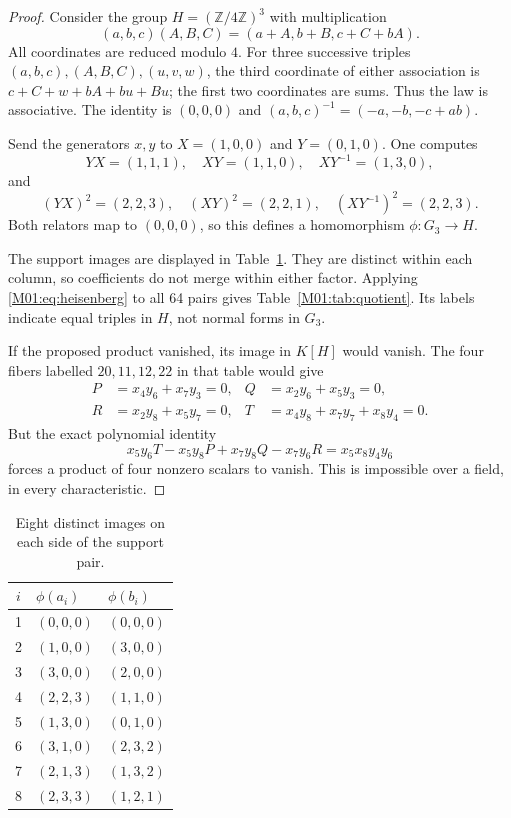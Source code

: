 \documentclass[11pt,a4paper,oneside]{report}
\theoremstyle{definition}
\theoremstyle{remark}
\newcommand{\Z}{\mathbb Z}
\begin{document}
\begin{proof}
Consider the group $H=(\Z/4\Z)^3$ with multiplication
\begin{equation}\label{M01:eq:heisenberg}
(a,b,c)(A,B,C)=(a+A,b+B,c+C+bA).
\end{equation}
All coordinates are reduced modulo $4$. For three successive triples
$(a,b,c),(A,B,C),(u,v,w)$, the third coordinate of either association
is $c+C+w+bA+bu+Bu$; the first two coordinates are sums.
Thus the law is associative. The identity is $(0,0,0)$ and
$(a,b,c)^{-1}=(-a,-b,-c+ab)$.

Send the generators $x,y$ to $X=(1,0,0)$ and $Y=(0,1,0)$.
One computes
\[
YX=(1,1,1),\quad XY=(1,1,0),\quad XY^{-1}=(1,3,0),
\]
and
\[
(YX)^2=(2,2,3),\quad (XY)^2=(2,2,1),\quad
(XY^{-1})^2=(2,2,3).
\]
Both relators map to $(0,0,0)$, so this defines a homomorphism
$\phi:G_3\to H$.

The support images are displayed in Table~\ref{M01:tab:images}. They are
distinct within each column, so coefficients do not merge within either
factor. Applying \eqref{M01:eq:heisenberg} to all 64 pairs gives
Table~\ref{M01:tab:quotient}. Its labels indicate equal triples in $H$,
not normal forms in $G_3$.

If the proposed product vanished, its image in $K[H]$ would vanish.
The four fibers labelled $20,11,12,22$ in that table would give
\begin{align*}
P&=x_4y_6+x_7y_3=0,&
Q&=x_2y_6+x_5y_3=0,\\
R&=x_2y_8+x_5y_7=0,&
T&=x_4y_8+x_7y_7+x_8y_4=0.
\end{align*}
But the exact polynomial identity
\begin{equation}\label{M01:eq:fourcert}
\boxed{x_5y_6T-x_5y_8P+x_7y_8Q-x_7y_6R
       =x_5x_8y_4y_6}
\end{equation}
forces a product of four nonzero scalars to vanish. This is impossible
over a field, in every characteristic.
\end{proof}

\begin{table}[htbp]
\centering\small
\begin{tabular}{@{}cll@{}}
\toprule
$i$ & $\phi(a_i)$ & $\phi(b_i)$\\
\midrule
1 & $(0,0,0)$ & $(0,0,0)$\\
2 & $(1,0,0)$ & $(3,0,0)$\\
3 & $(3,0,0)$ & $(2,0,0)$\\
4 & $(2,2,3)$ & $(1,1,0)$\\
5 & $(1,3,0)$ & $(0,1,0)$\\
6 & $(3,1,0)$ & $(2,3,2)$\\
7 & $(2,1,3)$ & $(1,3,2)$\\
8 & $(2,3,3)$ & $(1,2,1)$\\
\bottomrule
\end{tabular}
\caption{Eight distinct images on each side of the support pair.}
\label{M01:tab:images}
\end{table}
\end{document}
